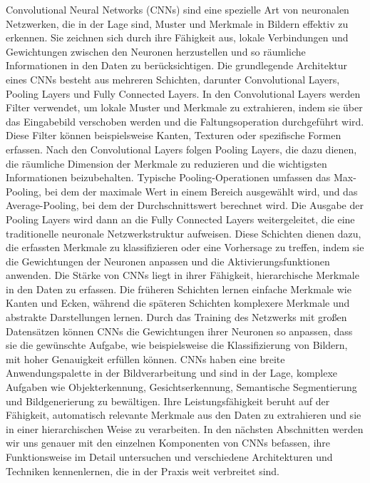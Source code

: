     Convolutional Neural Networks (CNNs) sind eine spezielle Art von neuronalen Netzwerken, die in der Lage sind, Muster und Merkmale in Bildern effektiv zu erkennen. 
    Sie zeichnen sich durch ihre Fähigkeit aus, lokale Verbindungen und Gewichtungen zwischen den Neuronen herzustellen und so räumliche Informationen in den Daten zu berücksichtigen.
    Die grundlegende Architektur eines CNNs besteht aus mehreren Schichten, darunter Convolutional Layers, Pooling Layers und Fully Connected Layers. 
    In den Convolutional Layers werden Filter verwendet, um lokale Muster und Merkmale zu extrahieren, indem sie über das Eingabebild verschoben werden und die Faltungsoperation durchgeführt wird. 
    Diese Filter können beispielsweise Kanten, Texturen oder spezifische Formen erfassen.
    Nach den Convolutional Layers folgen Pooling Layers, die dazu dienen, die räumliche Dimension der Merkmale zu reduzieren und die wichtigsten Informationen beizubehalten. 
    Typische Pooling-Operationen umfassen das Max-Pooling, bei dem der maximale Wert in einem Bereich ausgewählt wird, und das Average-Pooling, bei dem der Durchschnittswert berechnet wird.
    Die Ausgabe der Pooling Layers wird dann an die Fully Connected Layers weitergeleitet, die eine traditionelle neuronale Netzwerkstruktur aufweisen. Diese Schichten dienen dazu, die erfassten Merkmale zu klassifizieren oder eine Vorhersage zu treffen, indem sie die Gewichtungen der Neuronen anpassen und die Aktivierungsfunktionen anwenden.
    Die Stärke von CNNs liegt in ihrer Fähigkeit, hierarchische Merkmale in den Daten zu erfassen. 
    Die früheren Schichten lernen einfache Merkmale wie Kanten und Ecken, während die späteren Schichten komplexere Merkmale und abstrakte Darstellungen lernen. 
    Durch das Training des Netzwerks mit großen Datensätzen können CNNs die Gewichtungen ihrer Neuronen so anpassen, dass sie die gewünschte Aufgabe, wie beispielsweise die Klassifizierung von Bildern, mit hoher Genauigkeit erfüllen können.
    CNNs haben eine breite Anwendungspalette in der Bildverarbeitung und sind in der Lage, komplexe Aufgaben wie Objekterkennung, Gesichtserkennung, Semantische Segmentierung und Bildgenerierung zu bewältigen. 
    Ihre Leistungsfähigkeit beruht auf der Fähigkeit, automatisch relevante Merkmale aus den Daten zu extrahieren und sie in einer hierarchischen Weise zu verarbeiten.
    In den nächsten Abschnitten werden wir uns genauer mit den einzelnen Komponenten von CNNs befassen, ihre Funktionsweise im Detail untersuchen und verschiedene Architekturen und Techniken kennenlernen, die in der Praxis weit verbreitet sind.

